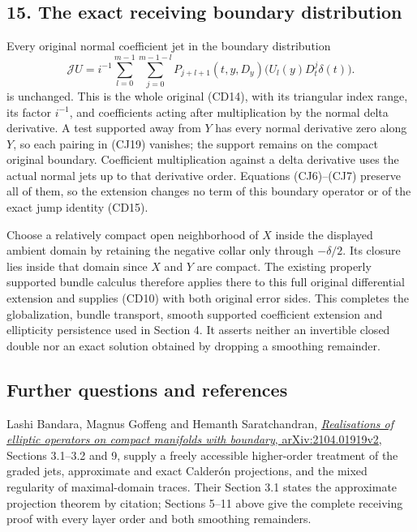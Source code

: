 \documentclass[
  11pt,
]{article}
\begin{document}
\subsection{15. The exact receiving boundary
distribution}\label{the-exact-receiving-boundary-distribution}

Every original normal coefficient jet in the boundary distribution \[
\mathcal JU=i^{-1}\sum_{l=0}^{m-1}\sum_{j=0}^{m-1-l}
P_{j+l+1}(t,y,D_y)\big(U_l(y)D_t^j\delta(t)\big).
\tag{CJ19}
\] is unchanged. This is the whole original (CD14), with its triangular
index range, its factor \(i^{-1}\), and coefficients acting after
multiplication by the normal delta derivative. A test supported away
from \(Y\) has every normal derivative zero along \(Y\), so each pairing
in (CJ19) vanishes; the support remains on the compact original
boundary. Coefficient multiplication against a delta derivative uses the
actual normal jets up to that derivative order. Equations (CJ6)--(CJ7)
preserve all of them, so the extension changes no term of this boundary
operator or of the exact jump identity (CD15).

Choose a relatively compact open neighborhood of \(X\) inside the
displayed ambient domain by retaining the negative collar only through
\(-\delta/2\). Its closure lies inside that domain since \(X\) and \(Y\)
are compact. The existing properly supported bundle calculus therefore
applies there to this full original differential extension and supplies
(CD10) with both original error sides. This completes the globalization,
bundle transport, smooth supported coefficient extension and ellipticity
persistence used in Section 4. It asserts neither an invertible closed
double nor an exact solution obtained by dropping a smoothing remainder.

\subsection{Further questions and
references}\label{further-questions-and-references}

Lashi Bandara, Magnus Goffeng and Hemanth Saratchandran,
\href{https://arxiv.org/abs/2104.01919v2}{\emph{Realisations of elliptic
operators on compact manifolds with boundary}, arXiv:2104.01919v2},
Sections 3.1--3.2 and 9, supply a freely accessible higher-order
treatment of the graded jets, approximate and exact Calderón
projections, and the mixed regularity of maximal-domain traces. Their
Section 3.1 states the approximate projection theorem by citation;
Sections 5--11 above give the complete receiving proof with every layer
order and both smoothing remainders.
\end{document}
